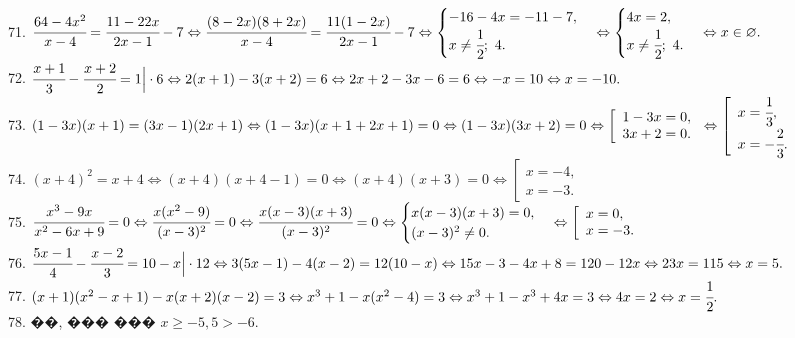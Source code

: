 \documentclass[12pt]{article}
\begin{document}
71. $\cfrac{64-4x^2}{x-4}=\cfrac{11-22x}{2x-1}-7\Leftrightarrow
\cfrac{(8-2x)(8+2x)}{x-4}=\cfrac{11(1-2x)}{2x-1}-7\Leftrightarrow
\begin{cases} -16-4x=-11-7,\\ x\neq\cfrac{1}{2};\ 4.\end{cases}\Leftrightarrow
\begin{cases} 4x=2,\\ x\neq\cfrac{1}{2};\ 4.\end{cases}\Leftrightarrow x\in\varnothing.$\\
72. $\cfrac{x+1}{3}-\cfrac{x+2}{2}=1\Big|\cdot6\Leftrightarrow
2(x+1)-3(x+2)=6\Leftrightarrow2x+2-3x-6=6\Leftrightarrow-x=10\Leftrightarrow x=-10.$\\
73. $(1-3x)(x+1)=(3x-1)(2x+1)\Leftrightarrow (1-3x)(x+1+2x+1)=0\Leftrightarrow(1-3x)(3x+2)=0\Leftrightarrow
\left[\begin{array}{l}1-3x=0,\\ 3x+2=0.\end{array}\right.\Leftrightarrow
\left[\begin{array}{l}x=\cfrac{1}{3},\\ x=-\cfrac{2}{3}.\end{array}\right.$\\
74. $(x+4)^2=x+4\Leftrightarrow (x+4)(x+4-1)=0\Leftrightarrow(x+4)(x+3)=0\Leftrightarrow\left[\begin{array}{l}x=-4,\\ x=-3.\end{array}\right.$\\
75. $\cfrac{x^3-9x}{x^2-6x+9}=0\Leftrightarrow\cfrac{x(x^2-9)}{(x-3)^2}=0\Leftrightarrow\cfrac{x(x-3)(x+3)}{(x-3)^2}=0\Leftrightarrow
\begin{cases} x(x-3)(x+3)=0,\\ (x-3)^2\neq0.\end{cases}\Leftrightarrow \left[\begin{array}{l}x=0,\\ x=-3.\end{array}\right.$\\
76. $\cfrac{5x-1}{4}-\cfrac{x-2}{3}=10-x\Big|\cdot12\Leftrightarrow
3(5x-1)-4(x-2)=12(10-x)\Leftrightarrow15x-3-4x+8=120-12x\Leftrightarrow23x=115\Leftrightarrow x=5.$\\
77. $(x+1)(x^2-x+1)-x(x+2)(x-2)=3\Leftrightarrow x^3+1-x(x^2-4)=3\Leftrightarrow
x^3+1-x^3+4x=3\Leftrightarrow4x=2\Leftrightarrow x=\cfrac{1}{2}.$\\
78. ��, ��� ��� $x\geqslant-5,5>-6.$\\
\end{document}
